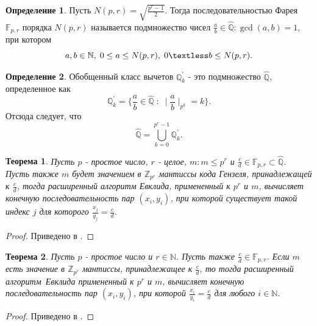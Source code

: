 \documentclass[master, och, diploma, times]{sty/SCWorks}
\theoremstyle{plain}
\newtheorem{thethm}{Теорема}[section]
\theoremstyle{definition}
\newtheorem{defn}{Определение}[section]
\numberwithin{equation}{section}
\begin{document}
\begin{defn}\label{def:farey}
Пусть $N(p, r)=\sqrt{\frac{p^r-1}{2}}$. Тогда последовательностью Фарея $\mathbb{F}_{p,r}$ порядка $N(p, r)$ называется подмножество чисел $\frac{a}{b} \in \hat{\mathbb{Q}}: \gcd{(a,b)}=1$, при котором
\begin{equation}
a, b \in \mathbb{N}, \; 0 \leq a \leq N(p, r), \; 0 \textless b \leq N(p, r).
\end{equation}
\end{defn}


\begin{defn}\label{def:qhat}
Обобщенный класс вычетов $\mathbb{Q}_k^{'}$ - это подмножество $\hat{\mathbb{Q}}$, определенное как
\begin{equation}
\mathbb{Q}_k^{'}=\bigg \{ \frac{a}{b} \in \hat{\mathbb{Q}} \; : \; \mid \frac{a}{b} \mid_{p^k}=k \bigg \}.
\end{equation}
Отсюда следует, что
\begin{equation}
\hat{\mathbb{Q}} = \bigcup\limits_{k=0}^{p^r-1} \mathbb{Q}_k^{'}.
\end{equation}
\end{defn}


\begin{thethm}\label{th:backward_mapping}
Пусть $p$ - простое число, $r$ - целое, $m: m \leq p^r$ и $\frac{c}{d} \in \mathbb{F}_{p,r} \subset \hat{\mathbb{Q}}$. Пусть также $m$ будет значением в $\mathbb{Z}_{p^r}$ мантиссы кода Гензеля, принадлежащей к $\frac{c}{d}$, тогда расширенный алгоритм Евклида, примененный к $p^r$ и $m$, вычисляет конечную последовательность пар $(x_i, y_i)$, при которой существует такой индекс $j$ для которого $\frac{x_j}{y_j}=\frac{c}{d}$.
\end{thethm}

\begin{proof}
Приведено в \cite{bib:numbers:miola}.
\end{proof}

\begin{thethm}
Пусть $p$ - простое число и $r \in \mathbb{N}$. Пусть также $\frac{c}{d} \in \mathbb{F}_{p,r}$. Если $m$ есть значение в $\mathbb{Z}_{p^r}$ мантиссы, принадлежащее к $\frac{c}{d}$, то тогда \mbox{расширенный} \mbox{алгоритм Евклида} примененный к $p^r$ и $m$, вычисляет конечную последовательность пар $(x_i, y_i)$, при которой $\frac{x_i}{y_i}=\frac{c}{d}$ для любого $i \in \mathbb{N}$.
\end{thethm}

\begin{proof}
Приведено в \cite{bib:numbers:miola}.
\end{proof}
\end{document}
